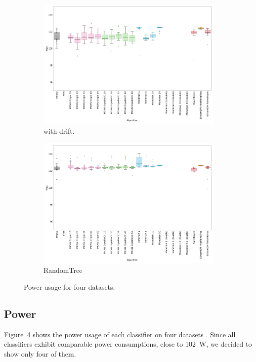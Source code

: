 \begin{figure}
\begin{subfigure}[t]{.49\linewidth}
		\caption{\recofitdataset}
		\label{fig:power-recofit}
	\end{subfigure}\\
	\begin{subfigure}[t]{.49\linewidth}
		\includegraphics[width=\linewidth]{figures/results/drift_3_watt.png}
		\caption{\banosdataset with drift.}
		\label{fig:power-drift}
	\end{subfigure}
	\hfill
	\begin{subfigure}[t]{.49\linewidth}
		\includegraphics[width=\linewidth]{figures/results/dataset_3_watt.png}
		\caption{RandomTree}
		\label{fig:power-dataset_3}
	\end{subfigure}
	\caption{Power usage for four datasets.}
	\label{fig:power}
\end{figure}
\subsection{Power}
\label{sec:result-power}
Figure~\ref{fig:power} shows the power usage of each classifier on four
datasets . Since all classifiers
exhibit comparable power consumptions, close to 102~W, we decided to show only
four of them.


